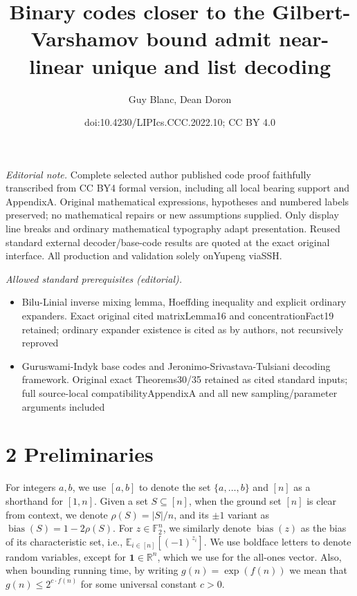 \documentclass[10pt,a4paper]{article}
\title{Binary codes closer to the Gilbert-Varshamov bound admit near-linear unique and list decoding}
\author{Guy Blanc, Dean Doron}
\date{doi:10.4230/LIPIcs.CCC.2022.10; CC BY 4.0}
\DeclareMathOperator{\bias}{bias}
\begin{document}
\maketitle
\noindent\textit{Editorial note.} Complete selected author published code proof faithfully transcribed from CC BY4 formal version, including all local bearing support and AppendixA. Original mathematical expressions, hypotheses and numbered labels preserved; no mathematical repairs or new assumptions supplied. Only display line breaks and ordinary mathematical typography adapt presentation. Reused standard external decoder/base-code results are quoted at the exact original interface. All production and validation solely onYupeng viaSSH.\par\medskip
\noindent\textit{Allowed standard prerequisites (editorial).}\begin{itemize}
\item Bilu-Linial inverse mixing lemma, Hoeffding inequality and explicit ordinary expanders. Exact original cited matrixLemma16 and concentrationFact19 retained; ordinary expander existence is cited as by authors, not recursively reproved
\item Guruswami-Indyk base codes and Jeronimo-Srivastava-Tulsiani decoding framework. Original exact Theorems30/35 retained as cited standard inputs; full source-local compatibilityAppendixA and all new sampling/parameter arguments included
\end{itemize}\medskip
\section*{2 Preliminaries}
For integers $a,b$, we use $[a,b]$ to denote the set $\{a,\ldots,b\}$ and $[n]$ as a shorthand for $[1,n]$. Given a set $S\subseteq[n]$, when the ground set $[n]$ is clear from context, we denote $\rho(S)=|S|/n$, and its $\pm1$ variant as $\bias(S)=1-2\rho(S)$. For $z\in\mathbb F_2^n$, we similarly denote $\bias(z)$ as the bias of its characteristic set, i.e., $\mathbb E_{i\in[n]}[(-1)^{z_i}]$. We use boldface letters to denote random variables, except for $\mathbf1\in\mathbb R^n$, which we use for the all-ones vector. Also, when bounding running time, by writing $g(n)=\exp(f(n))$ we mean that $g(n)\leq2^{c\cdot f(n)}$ for some universal constant $c>0$.
\end{document}
